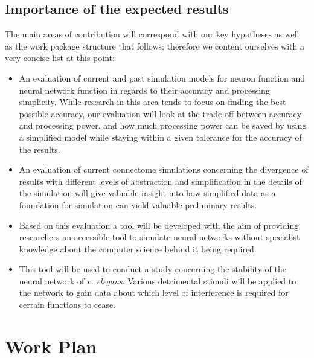 \documentclass[a4paper,11pt]{article}
\begin{document}
\subsection{Importance of the expected results}

The main areas of contribution will correspond with our key hypotheses as well as the work package structure that follows; therefore we content ourselves with a very concise list at this point:
\begin{itemize} 
  \item An evaluation of current and past simulation models for neuron function and neural network function in regards to their accuracy and processing simplicity. While research in this area tends to focus on finding the best possible accuracy, our evaluation will look at the trade-off between accuracy and processing power, and how much processing power can be saved by using a simplified model while staying within a given tolerance for the accuracy of the results.
  \item An evaluation of current connectome simulations concerning the divergence of results with different levels of abstraction and simplification in the details of the simulation will give valuable insight into how simplified data as a foundation for simulation can yield valuable preliminary results.
  \item Based on this evaluation a tool will be developed with the aim of providing researchers an accessible tool to simulate neural networks without specialist knowledge about the computer science behind it being required.
  \item This tool will be used to conduct a study concerning the stability of the neural network of \emph{c. elegans}. Various detrimental stimuli will be applied to the network to gain data about which level of interference is required for certain functions to cease. 
\end{itemize}


%

\section{Work Plan}
\end{document}
